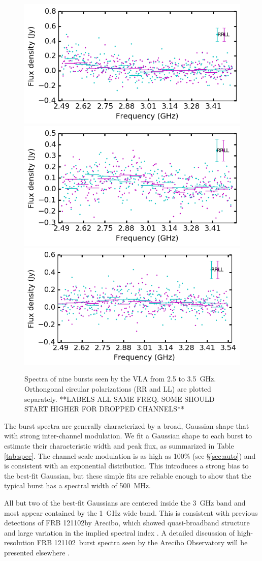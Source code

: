\documentclass[twocolumn]{aastex61}
\newcommand{\frb}{FRB 121102}
\begin{document}
\begin{figure}[ht]
\begin{center}
 \begin{minipage}{2\columnwidth}
  \includegraphics[width=0.3\columnwidth]{spec_57646.png}
  \includegraphics[width=0.3\columnwidth]{spec_57648.png}
  \includegraphics[width=0.3\columnwidth]{spec_57649.png}
 \end{minipage}
\caption{Spectra of nine bursts seen by the VLA from 2.5 to 3.5~GHz. Orthongonal circular polarizations (RR and LL) are plotted separately. **LABELS ALL SAME FREQ. SOME SHOULD START HIGHER FOR DROPPED CHANNELS**
\label{fig:spec}}
\end{center}
\end{figure}

The burst spectra are generally characterized by a broad, Gaussian shape that with strong inter-channel modulation. We fit a Gaussian shape to each burst to estimate their characteristic width and peak flux, as summarized in Table \ref{tab:spec}. The channel-scale modulation is as high as 100\% (see \S \ref{sec:auto}) and is consistent with an exponential distribution. This introduces a strong bias to the best-fit Gaussian, but these simple fits are reliable enough to show that the typical burst has a spectral width of 500~MHz.

All but two of the best-fit Gaussians are centered inside the 3~GHz band and most appear contained by the 1~GHz wide band. This is consistent with previous detections of \frb by Arecibo, which showed quasi-broadband structure \citep{2016arXiv160308880S} and large variation in the implied spectral index \citep{2014ApJ...790..101S}. A detailed discussion of high-resolution \frb\ burst spectra seen by the Arecibo Observatory will be presented elsewhere \citep{WEIRD}.
\end{document}
